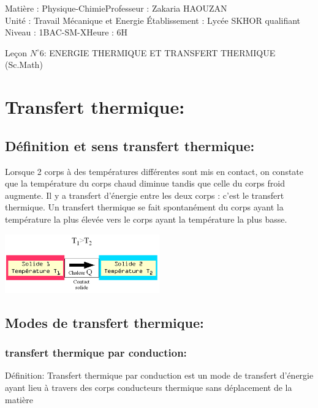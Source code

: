 \documentclass[12pt]{article}
\author{Zakaria HAOUZAN}
\date{\today}
\newcommand\headerMe[2]{\noindent{}#1\hfill#2}
\begin{document}
\headerMe{Matière : Physique-Chimie}{Professeur : Zakaria HAOUZAN}\\
\headerMe{Unité : Travail Mécanique et Energie }{Établissement : Lycée SKHOR qualifiant}\\
\headerMe{Niveau : 1BAC-SM-X}{Heure : 6H}\\

\begin{center}

    \Large{Leçon $N^{\circ} 6 $: \color{red}ENERGIE THERMIQUE ET
TRANSFERT THERMIQUE (Sc.Math) }
\end{center}

\section{Transfert thermique: }
\subsection{Définition et sens transfert thermique: }
Lorsque 2 corps à des températures différentes sont mis en contact, on constate que
la température du corps chaud diminue tandis que celle du corps froid augmente. Il y a
transfert d’énergie entre les deux corps : c’est le transfert thermique.
Un transfert thermique se fait spontanément du corps ayant la température la plus
élevée vers le corps ayant la température la plus basse.
\begin{center}

   \includegraphics[width=0.5\textwidth]{./img/img00}
\end{center}

\subsection{Modes de transfert thermique: }
\subsubsection{transfert thermique par conduction:}
{Définition:} Transfert thermique par conduction est un mode de transfert d’énergie ayant lieu à
travers des corps conducteurs thermique sans déplacement de la matière
\end{document}
